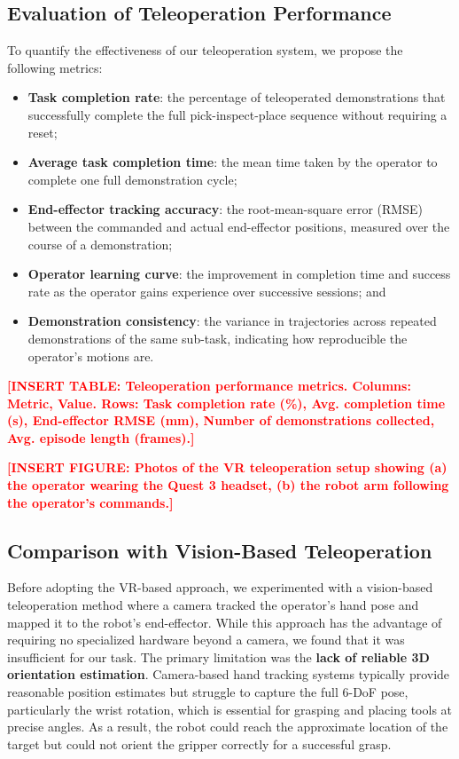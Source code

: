 \documentclass[conference]{IEEEtran}
\newcommand{\placeholder}[1]{\textcolor{red}{\textbf{[#1]}}}
\begin{document}
\subsection{Evaluation of Teleoperation Performance}

To quantify the effectiveness of our teleoperation system, we propose the following metrics:

\begin{itemize}
    \item \textbf{Task completion rate}: the percentage of teleoperated demonstrations that successfully complete the full pick-inspect-place sequence without requiring a reset;
    \item \textbf{Average task completion time}: the mean time taken by the operator to complete one full demonstration cycle;
    \item \textbf{End-effector tracking accuracy}: the root-mean-square error (RMSE) between the commanded and actual end-effector positions, measured over the course of a demonstration;
    \item \textbf{Operator learning curve}: the improvement in completion time and success rate as the operator gains experience over successive sessions; and
    \item \textbf{Demonstration consistency}: the variance in trajectories across repeated demonstrations of the same sub-task, indicating how reproducible the operator's motions are.
\end{itemize}

\placeholder{INSERT TABLE: Teleoperation performance metrics. Columns: Metric, Value. Rows: Task completion rate (\%), Avg. completion time (s), End-effector RMSE (mm), Number of demonstrations collected, Avg. episode length (frames).}

\placeholder{INSERT FIGURE: Photos of the VR teleoperation setup showing (a) the operator wearing the Quest 3 headset, (b) the robot arm following the operator's commands.}

\subsection{Comparison with Vision-Based Teleoperation}

Before adopting the VR-based approach, we experimented with a vision-based teleoperation method where a camera tracked the operator's hand pose and mapped it to the robot's end-effector. While this approach has the advantage of requiring no specialized hardware beyond a camera, we found that it was insufficient for our task. The primary limitation was the \textbf{lack of reliable 3D orientation estimation}. Camera-based hand tracking systems typically provide reasonable position estimates but struggle to capture the full 6-DoF pose, particularly the wrist rotation, which is essential for grasping and placing tools at precise angles. As a result, the robot could reach the approximate location of the target but could not orient the gripper correctly for a successful grasp.
\end{document}
